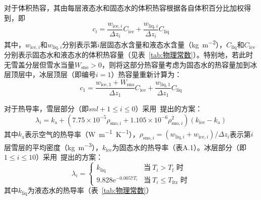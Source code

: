 对于体积热容，其由每层液态水和固态水的体积热容根据各自体积百分比加权得到，即
\begin{equation}
  c_i = \frac{w_{\mathrm{ice},i}}{\Delta z_i}C_{\mathrm{ice}} + \frac{w_{\mathrm{liq},i}}{\Delta z_i}C_{\mathrm{liq}}
\end{equation}
其中，$w_{\mathrm{ice},i}$和$w_{\mathrm{liq},i}$分别表示第$i$层固态水含量和液态水含量（\unit{kg.m^{-2}}），$C_{\mathrm{liq}}$和$C_{\mathrm{ice}}$分别表示固态水和液态水的体积热容量（见表~\ref{tab:物理常数}）。特别地，若此时无雪盖分层但雪水当量$W_{\mathrm{sno}}>0$，则将这部分热容量考虑为固态水的热容量加到冰层顶层中，冰层顶层（即编号$i=1$）热容量重新计算为：
\begin{equation}
  c_1 = \frac{w_{\mathrm{ice,1}}+W_{\mathrm{sno}}}{\Delta z_1}C_{\mathrm{ice}} + \frac{w_{\mathrm{liq,1}}}{\Delta z_1}C_{\mathrm{liq}}
\end{equation}

对于热导率，雪层部分（即$snl+1\leqslant i\leqslant 0$）采用~\citet{jordan1991one}提出的方案：
\begin{equation}
  \lambda_i = k_{\mathrm {a}}  + \left(7.75 \times 10^{-5} \rho_{\mathrm{sno},i} + 1.105\times 10^{-6} \rho^2_{\mathrm{sno},i}\right)\left(k_{\mathrm {ice}}-k_{\mathrm {a}} \right)
\end{equation}
其中$k_{\mathrm {a}} $表示空气的热导率（\unit{W.m^{-1}.K^{-1}}），$\rho_{\mathrm{sno},i}=\left(w_{\mathrm{liq},i}+w_{\mathrm{ice},i}\right)/\Delta z_i$表示第$i$层雪层的平均密度（\unit{kg.m^{-3}}），$k_{\mathrm {ice}}$为固态水的热导率（表A.1）。冰层部分（即$1\leqslant i \leqslant 10$）采用~\citet{yen1981review}提出的方案：
\begin{equation}
  \lambda_i =\begin{cases}
    k_{\mathrm {liq}} &\text{当}\ T_i > T_{\mathrm f} \text{ 时} \\
    9.828 {\mathrm e}^{-0.0057 T_i} &\text{当}\ T_i \leqslant T_{\mathrm {frz}}  \text{ 时}
  \end{cases}
\end{equation}
其中$k_{\mathrm {liq}}$为液态水的热导率（表~\ref{tab:物理常数}）

